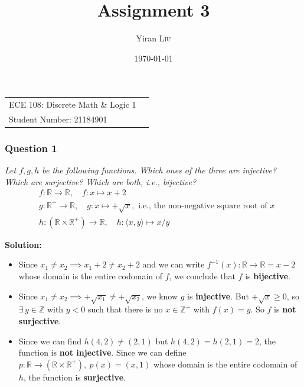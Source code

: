 \documentclass[
	letterpaper, %
	11pt, %
]{CSUniSchoolLabReport}
\title{Assignment 3} %
\author{Yiran \textsc{Liu}} %
\date{\today} %
\begin{document}
\maketitle %

\begin{center}
	\begin{tabular}{l r}
      ECE 108: Discrete Math \& Logic 1 \\
      Student Number: 21184901
	\end{tabular}
\end{center}


\subsubsection*{Question 1}
\textit{Let $f, g, h$ be the following functions. Which ones of the three are injective? Which are surjective? Which are both, i.e., bijective?}
\begin{align*}
&f\!:\mathbb{R}\to\mathbb{R},\quad f: x\mapsto x+2 \\
&g\!:\mathbb{R}^+\to\mathbb{R},\quad g: x\mapsto +\sqrt{x}, \text{ i.e., the non-negative square root of } x \\
&h\!:(\mathbb{R}\times\mathbb{R}^+)\to \mathbb{R},\quad h: \langle x,y \rangle\mapsto x/y
\end{align*}

\textbf{Solution:}
\begin{itemize}
	\item Since $x_1 \neq x_2 \implies x_1+2 \neq x_2+2$ and we can write $f^{-1}(x):\mathbb{R} \to \mathbb{R} = x - 2$ whose domain is the entire codomain of $f$, we conclude that $f$ is \textbf{bijective}.

	\item Since $x_1 \neq x_2 \implies +\sqrt{x_1} \neq +\sqrt{x_2}$, we know $g$ is \textbf{injective}.
	But $+\sqrt{x} \geq 0$, so $\exists\, y \in \mathbb{Z}$ with $y < 0$ such that there is no $x \in \mathbb{Z}^+$ with $f(x) = y$.
	So $f$ is \textbf{not surjective}.

	\item Since we can find $h(4,2) \neq (2,1)$ but $h(4,2) = h(2,1) = 2$, the function is \textbf{not injective}.
	Since we can define $p: \mathbb{R} \to (\mathbb{R} \times \mathbb{R}^+),\ p(x) = (x, 1)$ whose domain is the entire codomain of $h$, the function is \textbf{surjective}.
\end{itemize}
\end{document}
